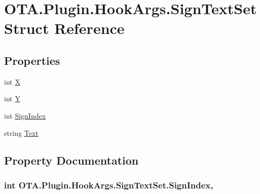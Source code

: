 \hypertarget{struct_o_t_a_1_1_plugin_1_1_hook_args_1_1_sign_text_set}{}\section{O\+T\+A.\+Plugin.\+Hook\+Args.\+Sign\+Text\+Set Struct Reference}
\label{struct_o_t_a_1_1_plugin_1_1_hook_args_1_1_sign_text_set}
\subsection*{Properties}
\begin{DoxyCompactItemize}
\item 
int \hyperlink{struct_o_t_a_1_1_plugin_1_1_hook_args_1_1_sign_text_set_a8e80803b1b4f31427a2d9c15ef0aceaf}{X}
\item 
int \hyperlink{struct_o_t_a_1_1_plugin_1_1_hook_args_1_1_sign_text_set_a229a87aad23e7229f9d44680be28207e}{Y}
\item 
int \hyperlink{struct_o_t_a_1_1_plugin_1_1_hook_args_1_1_sign_text_set_aac10e44a0484f046112c0bb2b12bcf84}{Sign\+Index}
\item 
string \hyperlink{struct_o_t_a_1_1_plugin_1_1_hook_args_1_1_sign_text_set_a114083f3df5a080712423993b605c0b3}{Text}
\end{DoxyCompactItemize}


\subsection{Property Documentation}
\hypertarget{struct_o_t_a_1_1_plugin_1_1_hook_args_1_1_sign_text_set_aac10e44a0484f046112c0bb2b12bcf84}{}
\subsubsection[{Sign\+Index}]{\setlength{\rightskip}{0pt plus 5cm}int O\+T\+A.\+Plugin.\+Hook\+Args.\+Sign\+Text\+Set.\+Sign\+Index\hspace{0.3cm}{\ttfamily [get]}, {\ttfamily [set]}}\label{struct_o_t_a_1_1_plugin_1_1_hook_args_1_1_sign_text_set_aac10e44a0484f046112c0bb2b12bcf84}
\hypertarget{struct_o_t_a_1_1_plugin_1_1_hook_args_1_1_sign_text_set_a114083f3df5a080712423993b605c0b3}{}
